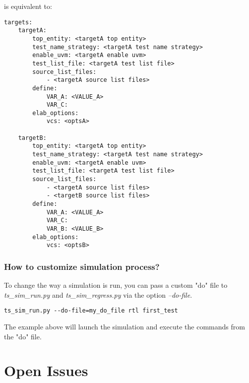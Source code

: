 \documentclass{tropic_design_spec}
\begin{document}
is equivalent to:

\begin{lstlisting}
targets:
    targetA:
        top_entity: <targetA top entity>
        test_name_strategy: <targetA test name strategy>
        enable_uvm: <targetA enable uvm>
        test_list_file: <targetA test list file>
        source_list_files:
            - <targetA source list files>
        define:
            VAR_A: <VALUE_A>
            VAR_C:
        elab_options:
            vcs: <optsA>

    targetB:
        top_entity: <targetA top entity>
        test_name_strategy: <targetA test name strategy>
        enable_uvm: <targetA enable uvm>
        test_list_file: <targetA test list file>
        source_list_files:
            - <targetA source list files>
            - <targetB source list files>
        define:
            VAR_A: <VALUE_A>
            VAR_C:
            VAR_B: <VALUE_B>
        elab_options:
            vcs: <optsB>
\end{lstlisting}


\subsubsection{How to customize simulation process?}
\label{sec:how-to-customize-simulation-process}

To change the way a simulation is run, you can pass a custom "do" file to
\textit{ts_sim_run.py} and \textit{ts_sim_regress.py} via the option \textit{--do-file}.

\begin{lstlisting}
ts_sim_run.py --do-file=my_do_file rtl first_test
\end{lstlisting}

The example above will launch the simulation and execute the commands from the "do" file.


\pagebreak
\section{Open Issues}

\PrintOpenIssueSummary
 
\end{document}
